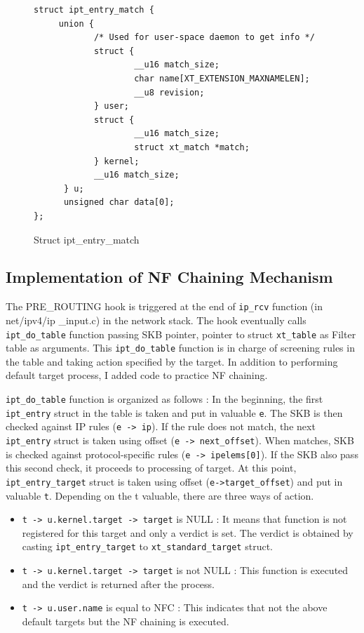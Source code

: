\begin{figure}			
	\begin{center}
		\begin{screen}
			\begin{verbatim}
struct ipt_entry_match {
     union {
            /* Used for user-space daemon to get info */
            struct {
                    __u16 match_size;
                    char name[XT_EXTENSION_MAXNAMELEN];
                    __u8 revision;
            } user;
            struct {
                    __u16 match_size;
                    struct xt_match *match;
            } kernel;
            __u16 match_size;
      } u;
      unsigned char data[0];
};
			\end{verbatim}
		\end{screen}
	\end{center}	
	\caption{Struct ipt\_entry\_match}
	\label{fig: imp4}
\end{figure}

\subsection{Implementation of NF Chaining Mechanism}
The PRE\_ROUTING hook is triggered at the end of {\tt ip\_rcv} function (in net/ipv4/ip
\_input.c) in the network stack. The hook eventually calls {\tt ipt\_do\_table} function passing SKB pointer, pointer to struct {\tt xt\_table} as Filter table as arguments. This {\tt ipt\_do\_table} function is in charge of screening rules in the table and taking action specified by the  target. In addition to performing default target process, I added code to practice NF chaining. 

{\tt ipt\_do\_table} function is organized as follows : In the beginning, the first {\tt ipt\_entry} struct  in the table is taken and put in valuable {\tt e}. The SKB is then checked against IP rules ({\tt e -\verb#># ip}). If the rule does not match, the next {\tt ipt\_entry} struct is taken using offset ({\tt e -\verb#># next\_offset}). When matches, SKB is checked against protocol-specific rules ({\tt e -\verb#># ipelems[0]}). If the SKB also pass this second check, it proceeds to processing of target. At this point, {\tt ipt\_entry\_target} struct is taken using offset ({\tt e-\verb#>#target\_offset}) and put in valuable {\tt t}. Depending on the t valuable, there are three ways of action. 
\begin{itemize}
	\item {\tt t -\verb#># u.kernel.target -\verb#># target} is NULL : It means that function is not registered for this target and only a verdict is set. The verdict is obtained by casting {\tt ipt\_entry\_target} to {\tt xt\_standard\_target} struct. 
	\item {\tt t -\verb#># u.kernel.target -\verb#># target} is not NULL : This function is executed and the verdict is returned after the process.   
	\item {\tt t -\verb#># u.user.name} is equal to NFC : This indicates that not the above default targets but the NF chaining is executed. 
\end{itemize}

